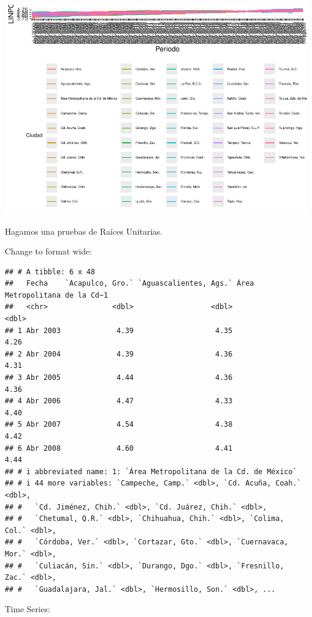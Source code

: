 \documentclass[
]{book}
\begin{document}
\includegraphics{Notas-Series-Tiempo_files/figure-latex/unnamed-chunk-31-1.pdf}

Hagamos una pruebas de Raíces Unitarias.

Change to format wide:

\begin{verbatim}
## # A tibble: 6 x 48
##   Fecha    `Acapulco, Gro.` `Aguascalientes, Ags.` Área Metropolitana de la Cd~1
##   <chr>               <dbl>                  <dbl>                         <dbl>
## 1 Abr 2003             4.39                   4.35                          4.26
## 2 Abr 2004             4.39                   4.36                          4.31
## 3 Abr 2005             4.44                   4.36                          4.36
## 4 Abr 2006             4.47                   4.33                          4.40
## 5 Abr 2007             4.54                   4.38                          4.42
## 6 Abr 2008             4.60                   4.41                          4.44
## # i abbreviated name: 1: `Área Metropolitana de la Cd. de México`
## # i 44 more variables: `Campeche, Camp.` <dbl>, `Cd. Acuña, Coah.` <dbl>,
## #   `Cd. Jiménez, Chih.` <dbl>, `Cd. Juárez, Chih.` <dbl>,
## #   `Chetumal, Q.R.` <dbl>, `Chihuahua, Chih.` <dbl>, `Colima, Col.` <dbl>,
## #   `Córdoba, Ver.` <dbl>, `Cortazar, Gto.` <dbl>, `Cuernavaca, Mor.` <dbl>,
## #   `Culiacán, Sin.` <dbl>, `Durango, Dgo.` <dbl>, `Fresnillo, Zac.` <dbl>,
## #   `Guadalajara, Jal.` <dbl>, `Hermosillo, Son.` <dbl>, ...
\end{verbatim}

Time Series:
\end{document}
